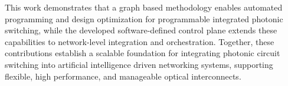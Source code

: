 This work demonstrates that a graph based methodology enables automated programming and design optimization for programmable integrated photonic switching, while the developed software-defined control plane extends these capabilities to network-level integration and orchestration.
Together, these contributions establish a scalable foundation for integrating photonic circuit switching into artificial intelligence driven networking systems, supporting flexible, high performance, and manageable optical interconnects.
